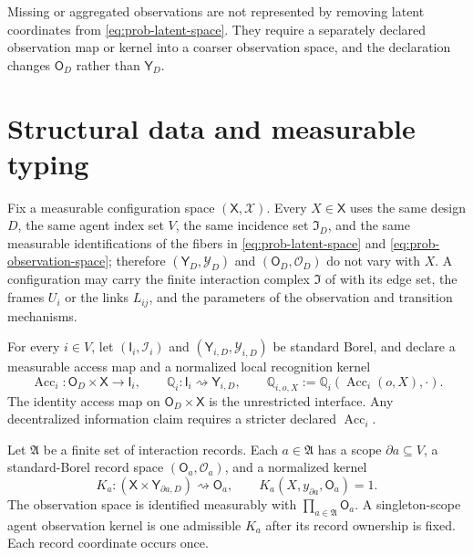 Missing or aggregated observations are not represented by removing latent coordinates from \eqref{eq:prob-latent-space}. They require a separately declared observation map or kernel into a coarser observation space, and the declaration changes $\mathsf O_D$ rather than $\mathsf Y_D$.

\section{Structural data and measurable typing}
\label{sec:prob-structural}

\medskip
{}
Fix a measurable configuration space $(\mathsf X,\mathscr X)$. Every $X\in\mathsf X$ uses the same design $D$, the same agent index set $V$, the same incidence set $\mathfrak I_D$, and the same measurable identifications of the fibers in \eqref{eq:prob-latent-space} and \eqref{eq:prob-observation-space}; therefore $(\mathsf Y_D,\mathscr Y_D)$ and $(\mathsf O_D,\mathscr O_D)$ do not vary with $X$. A configuration may carry the finite interaction complex $\mathfrak I$ of  with its edge set, the frames $U_i$ or the links $L_{ij}$, and the parameters of the observation and transition mechanisms.

For every $i\in V$, let $(\mathsf I_i,\mathscr I_i)$ and $(\mathsf Y_{i,D},\mathscr Y_{i,D})$ be standard Borel, and declare a measurable access map and a normalized local recognition kernel
\begin{equation}
\operatorname{Acc}_i:\mathsf O_D\times\mathsf X\longrightarrow\mathsf I_i,
\qquad
\mathbb Q_i:\mathsf I_i\rightsquigarrow\mathsf Y_{i,D},
\qquad
\mathbb Q_{i,o,X}:=\mathbb Q_i(\operatorname{Acc}_i(o,X),\cdot).
\label{eq:prob-local-recognition-kernel}
\end{equation}
The identity access map on $\mathsf O_D\times\mathsf X$ is the unrestricted interface. Any decentralized information claim requires a stricter declared $\operatorname{Acc}_i$.

Let $\mathfrak A$ be a finite set of interaction records. Each $a\in\mathfrak A$ has a scope $\partial a\subseteq V$, a standard-Borel record space $(\mathsf O_a,\mathscr O_a)$, and a normalized kernel
\begin{equation}
K_a:(\mathsf X\times\mathsf Y_{\partial a,D})\rightsquigarrow\mathsf O_a,
\qquad
K_a(X,y_{\partial a},\mathsf O_a)=1.
\label{eq:prob-record-kernel-signature}
\end{equation}
The observation space is identified measurably with $\prod_{a\in\mathfrak A}\mathsf O_a$. A singleton-scope agent observation kernel is one admissible $K_a$ after its record ownership is fixed. Each record coordinate occurs once.

